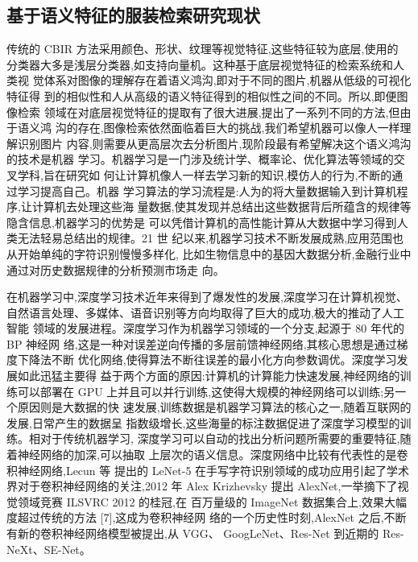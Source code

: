 \subsection{基于语义特征的服装检索研究现状}
传统的 CBIR 方法采用颜色、形状、纹理等视觉特征,这些特征较为底层,使用的
分类器大多是浅层分类器,如支持向量机。这种基于底层视觉特征的检索系统和人类视
觉体系对图像的理解存在着语义鸿沟,即对于不同的图片,机器从低级的可视化特征得
到的相似性和人从高级的语义特征得到的相似性之间的不同\cite{卢兴敬2008基于内容的服装图像检索技术研究及实现}。所以,即便图像检索
领域在对底层视觉特征的提取有了很大进展,提出了一系列不同的方法,但由于语义鸿
沟的存在,图像检索依然面临着巨大的挑战,我们希望机器可以像人一样理解识别图片
内容,则需要从更高层次去分析图片,现阶段最有希望解决这个语义鸿沟的技术是机器
学习。机器学习是一门涉及统计学、概率论、优化算法等领域的交叉学科,旨在研究如
何让计算机像人一样去学习新的知识,模仿人的行为,不断的通过学习提高自己。机器
学习算法的学习流程是:人为的将大量数据输入到计算机程序,让计算机去处理这些海
量数据,使其发现并总结出这些数据背后所蕴含的规律等隐含信息,机器学习的优势是
可以凭借计算机的高性能计算从大数据中学习得到人类无法轻易总结出的规律。21 世
纪以来,机器学习技术不断发展成熟,应用范围也从开始单纯的字符识别慢慢多样化,
比如生物信息中的基因大数据分析,金融行业中通过对历史数据规律的分析预测市场走
向。

在机器学习中,深度学习技术近年来得到了爆发性的发展,深度学习在计算机视觉、
自然语言处理、多媒体、语音识别等方向均取得了巨大的成功,极大的推动了人工智能
领域的发展进程。深度学习作为机器学习领域的一个分支,起源于 80 年代的 BP \cite{rumelhart1988learning}神经网
络,这是一种对误差逆向传播的多层前馈神经网络,其核心思想是通过梯度下降法不断
优化网络,使得算法不断往误差的最小化方向参数调优。深度学习发展如此迅猛主要得
益于两个方面的原因:计算机的计算能力快速发展,神经网络的训练可以部署在 GPU
上并且可以并行训练,这使得大规模的神经网络可以训练;另一个原因则是大数据的快
速发展,训练数据是机器学习算法的核心之一,随着互联网的发展,日常产生的数据呈
指数级增长,这些海量的标注数据促进了深度学习模型的训练。相对于传统机器学习,
深度学习可以自动的找出分析问题所需要的重要特征,随着神经网络的加深,可以抽取
上层次的语义信息。深度网络中比较有代表性的是卷积神经网络,Lecun 等 提出的
LeNet-5\cite{lecun1998gradient} 在手写字符识别领域的成功应用引起了学术界对于卷积神经网络的关注,2012
年 Alex Krizhevsky 提出 AlexNet\cite{krizhevsky2012imagenet},一举摘下了视觉领域竞赛 ILSVRC 2012 的桂冠,在
百万量级的 ImageNet\cite{deng2009imagenet} 数据集合上,效果大幅度超过传统的方法 [7],这成为卷积神经网
络的一个历史性时刻,AlexNet 之后,不断有新的卷积神经网络模型被提出,从 VGG\cite{simonyan2014very}、
GoogLeNet\cite{szegedy2015going}、Res-Net\cite{he2016deep} 到近期的 Res-NeXt\cite{xie2017aggregated}、SE-Net\cite{hu2018squeeze}。

